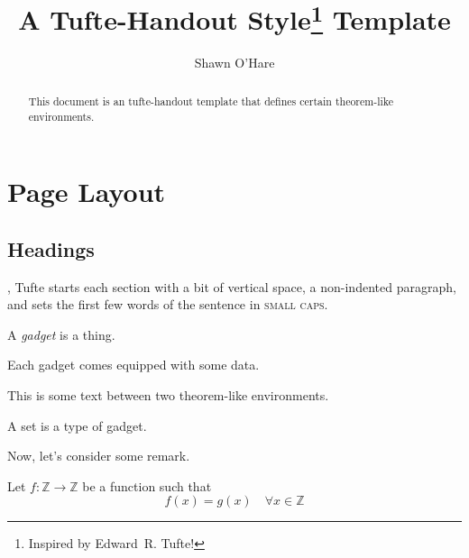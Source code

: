 \documentclass{tufte-handout}
\title{A Tufte-Handout Style\thanks{Inspired by Edward~R. Tufte!} Template}
\author{Shawn O'Hare}
\numberwithin{equation}{section}
\begin{document}
\maketitle%

\begin{abstract}
\noindent
This document is an tufte-handout template that defines certain theorem-like
environments.
\end{abstract}

\tableofcontents

\section{Page Layout}\label{sec:page-layout}
\subsection{Headings}\label{sec:headings}

,\cite{Tufte2006} Tufte
starts each section with a bit of vertical space, a non-indented paragraph,
and sets the first few words of the sentence in \textsc{small caps}.

\begin{defn}[Gadget]
  A \emph{gadget} is a thing.
  
  Each gadget comes equipped with some data.
\end{defn}

This is some text between two theorem-like environments.

\begin{example}[Gadget]
  A set is a type of gadget.  
\end{example}

\begin{remark}
  Now, let's consider some remark.
\end{remark}

\begin{theorem}
  Let $f \colon \mathbb Z \to \mathbb Z$ be a function such that
  \begin{equation}
    f(x) = g(x) \quad \forall x \in \mathbb Z
  \end{equation}
\end{theorem}




\end{document}
